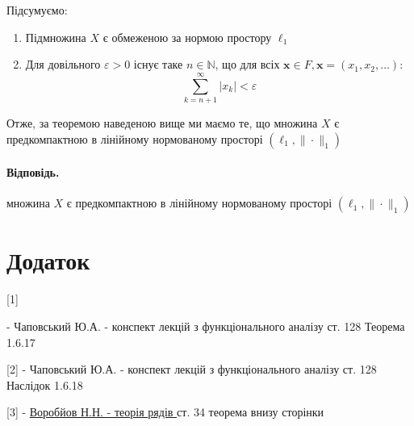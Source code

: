 \documentclass[a5paper, 20pt, titlepage]{article}
\newcommand{\x}{\textbf{x}}
\begin{document}
\newpage 

Підсумуємо:

\begin{enumerate}
\item Підмножина $X$ є обмеженою за нормою простору $\ell_1$
\item Для довільного $\varepsilon > 0$ існує таке $n \in \mathbb{N}$, що для всіх $\x \in F, \x = (x_1, x_2, \dots)$: 
$$ \sum \limits_{k = n + 1}^{\infty}|x_k| < \varepsilon$$
\end{enumerate}

Отже, за теоремою наведеною вище ми маємо те, що множина $X$ є предкомпактною в лінійному нормованому просторі $\left(\ell_1, \| \cdot \|_1 \right)$

\paragraph{Відповідь.} множина $X$ є предкомпактною в лінійному нормованому просторі $\left(\ell_1, \| \cdot \|_1 \right)$

\vspace{4mm}
\section*{Додаток }

\hypertarget{1}{[1]} - Чаповський Ю.А. - конспект лекцій з функціонального аналізу  ст. 128 Теорема 1.6.17

\hspace{-6.3mm}
[2] - Чаповський Ю.А. - конспект лекцій з функціонального аналізу  ст. 128 Наслідок 1.6.18

\hspace{-6.3mm}
[3] - \href{https://drive.google.com/file/d/1TjgKePwptgl93cQ0WRwgO9wxc3RV5srA/view?usp=share_link}{Воробйов Н.Н. - теорія рядів } ст. 34 теорема внизу сторінки
\end{document}
